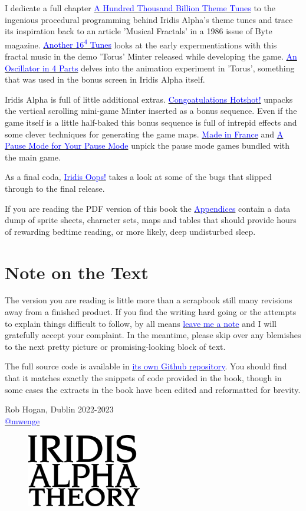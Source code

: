 I dedicate a full chapter \hyperref[sec:first16]{\textcolor{blue}{A Hundred Thousand Billion Theme Tunes}} to the ingenious procedural programming behind Iridis Alpha's theme
tunes and trace its inspiration back to an article 'Musical Fractals' in a 1986 issue of Byte magazine. \hyperref[sec:torusmusic]{\textcolor{blue}{Another 16\textsuperscript{4} Tunes}} looks
at the early expermentiations with this fractal music in the demo 'Torus' Minter released while developing the game. \hyperref[sec:torus]{\textcolor{blue}{An Oscillator in 4 Parts}} delves
into the animation experiment in 'Torus', something that was used in the bonus screen in Iridis Alpha itself.

Iridis Alpha is full of little additional extras. \hyperref[sec:bonus]{\textcolor{blue}{Congoatulations Hotshot!}} unpacks the vertical
scrolling mini-game Minter inserted as a bonus sequence. Even if the game itself is a little half-baked this bonus sequence is full of intrepid effects and some clever techniques
for generating the game maps. \hyperref[sec:mif]{\textcolor{blue}{Made in France}} and \hyperref[sec:dna]{\textcolor{blue}{A Pause Mode for Your Pause Mode}} unpick the pause mode games
bundled with the main game.

As a final coda, \hyperref[sec:bugs]{\textcolor{blue}{Iridis Oops!}} takes a look at some of the bugs that slipped through to the final release. 

If you are reading the PDF version of this book the \hyperref[sec:appendices]{\textcolor{blue}{Appendices}} contain a data dump of sprite sheets, character sets, maps and tables that 
should provide hours of rewarding bedtime reading, or more likely, deep undisturbed sleep.

\section*{Note on the Text}
The version you are reading is little more than a scrapbook still many revisions away from a
finished product. If you find the writing hard going or the attempts to explain things difficult
to follow, by all means \href{https://github.com/mwenge/iatheory/issues}{\textcolor{blue}{leave me a note}} and
I will gratefully accept your complaint. In the meantime, please skip over any blemishes
to the next pretty picture or promising-looking block of text.

The full source code is available in \href{https://github.com/mwenge/iridisalpha}{\textcolor{blue}{its own Github repository}}. 
You should find that it matches exactly the snippets of code provided in the book, though in some cases the extracts in the book have been edited
and reformatted for brevity.


Rob Hogan, Dublin 2022-2023 \\
\href{https://mastodon.social/@mwenge}{\textcolor{blue}{@mwenge}}
\clearpage
\vspace*{\fill}
\begin{figure}[H]
    \centering
      \includegraphics[width=5cm]{src/cover/title_page.png}%
\end{figure}
\vspace*{\fill}
\thispagestyle{empty}%
\clearpage

